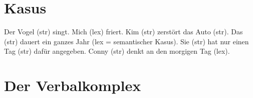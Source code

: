 \section{Kasus}

\eal
\ex Der Vogel (str) singt.  
\ex Mich (lex) friert.    
\ex Kim (str) zerstört das Auto (str).
\ex Das (str) dauert ein ganzes Jahr (lex = semantischer Kasus).
\ex Sie (str) hat nur einen Tag (str) dafür angegeben.
\ex Conny (str) denkt an den morgigen Tag (lex).
\zl

\section{Der Verbalkomplex}
\largerpage

\oneline{
\begin{forest}
sm edges
[{\ms[cat]{ head   & \ibox{1} \\
           comps & \eliste\\
            }}
 [{\ibox{2} NP[\type{nom}]} [Aicke]]
 [{\ms[cat]{ head   & \ibox{1} \\
             comps & \ibox{3}\\
            }}
   [\iboxt{5}~\onems{ loc \ms{ head & \ibox{4} \\
                               comps & \ibox{3} \\
                                 }}
     [\iboxt{6}~\onems{ loc \onems{ head  \ms[verb]{ vform & bse  \\
                                                }  \\
                                comps~\ibox{3} \nliste{ \ibox{2} NP[\nom] } \\
                              }\\
                } [singen]]
     [{\onems[cat]{ head~\ibox{4} \ms[verb]{ vform & bse \\
                            } \\
            comps ~ \ibox{3} $\oplus$ \sliste{ \ibox{6} } \\
          }} [können]]]
    [{\ms[cat]{ head & \ibox{1} \ms[verb]{ vform & fin \\
                                                    } \\
                      comps & \ibox{3} $\oplus$ \sliste{ \ibox{5} } \\
                    }} [muss]]]]
\end{forest}
}


